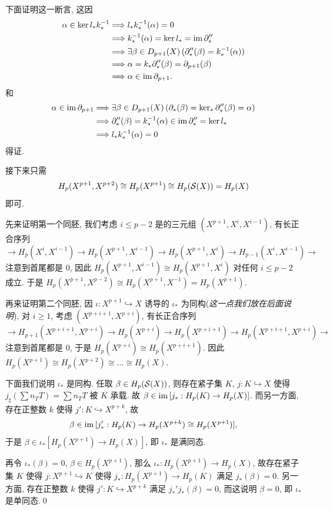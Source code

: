 \begin{Proof}
	下面证明这一断言, 这因
	\[
		\begin{aligned}
			\alpha\in\ker l_*k_*^{-1}&\Longrightarrow l_*k_*^{-1}(\alpha)=0\\
			&\Longrightarrow k_*^{-1}(\alpha)=\ker l_*=\mathrm{im}\,\partial_*''\\
			&\Longrightarrow\exists\beta\in D_{p+1}(X)\,(\partial_*''(\beta)=k_*^{-1}(\alpha))\\
			&\Longrightarrow\alpha=k_*\partial_*''(\beta)=\partial_{p+1}(\beta)\\
			&\Longrightarrow\alpha\in\mathrm{im}\,\partial_{p+1}.
		\end{aligned}
	\]
	和
	\[
		\begin{aligned}
			\alpha\in\mathrm{im}\,\partial_{p+1}&\Longrightarrow\exists\beta\in D_{p+1}(X)\,(\partial_*(\beta)=\ker_*\partial_*''(\beta)=\alpha)\\
			&\Longrightarrow\partial_*''(\beta)=k_*^{-1}(\alpha)\in\mathrm{im}\,\partial_*''=\ker l_*\\
			&\Longrightarrow l_*k_*^{-1}(\alpha)=0
		\end{aligned}
	\]
	得证.

	接下来只需
	\[
		H_p(X^{p+1},X^{p+2})\cong H_p(X^{p+1})\cong H_p(\mathcal{S}(X))=H_p(X)
	\]
	即可.

	先来证明第一个同胚, 我们考虑 $ i\leqslant p-2 $ 是的三元组 $ (X^{p+1},X^i,X^{i-1}) $, 有长正合序列
	\[
		\rightarrow H_p(X^i,X^{i-1})\rightarrow H_p(X^{p+1},X^{i-1})\rightarrow H_p(X^{p+1},X^i)\rightarrow H_{p-1}(X^{i},X^{i-1})\rightarrow
	\]
	注意到首尾都是 0, 因此 $ H_p(X^{p+1},X^{i-1})\cong H_p(X^{p+1},X^i) $ 对任何 $ i\leqslant p-2 $ 成立. 于是 $ H_p(X^{p+1},X^{p-2})\cong H_p(X^{p+1},X^{-1})=H_p(X^{p+1}) $.

	再来证明第二个同胚, 因 $ \iota : X^{p+1}\hookrightarrow X $ 诱导的 $ \iota_* $ 为同构(\textit{这一点我们放在后面说明}), 对 $ i\geqslant 1 $, 考虑 $ (X^{p+i+1},X^{p+i}) $, 有长正合序列
	\[
		\rightarrow H_{p+1}(X^{p+i+1},X^{p+i})\rightarrow H_p(X^{p+i})\rightarrow H_p(X^{p+i+1})\rightarrow H_{p}(X^{p+i+1},X^{p+i})\rightarrow
	\]
	注意到首尾都是 0, 于是 $ H_p(X^{p+i})\cong H_p(X^{p+i+1}) $. 因此 $ H_p(X^{p+1})\cong H_p(X^{p+2})\cong \dots\cong H_p(X) $.

	下面我们说明 $ \iota_* $ 是同构. 任取 $ \beta\in H_p(\mathcal{S}(X)) $, 则存在紧子集 $ K $, $ j : K\hookrightarrow X $ 使得 $ j_\sharp(\sum n_TT)=\sum n_TT $ 被 $ K $ 承载. 故 $ \beta\in\mathrm{im}\,[j_* : H_p(K)\to H_p(X)] $. 而另一方面, 存在正整数 $ k $ 使得 $ j' : K\hookrightarrow X^{p+k} $, 故
	\[
		\beta\in\mathrm{im}\,[j_*' : H_p(K)\to H_p(X^{p+k})\cong H_p(X^{p+1})],
	\]
	于是 $ \beta\in\iota_*[H_p(X^{p+1})\to H_p(X)] $, 即 $ \iota_* $ 是满同态.

	再令 $ \iota_*(\beta)=0 $, $ \beta\in H_p(X^{p+1}) $, 那么 $ \iota_* : H_p(X^{p+1})\to H_p(X) $, 故存在紧子集 $ K $ 使得 $ j : X^{p+1}\hookrightarrow K $ 使得 $ j_* : H_p(X^{p+1})\to H_p(K) $ 满足 $ j_*(\beta)=0 $. 另一方面, 存在正整数 $ k $ 使得 $ j' : K\hookrightarrow X^{p+k} $ 满足 $ j_*'j_*(\beta)=0 $, 而这说明 $ \beta=0 $, 即 $ \iota_* $ 是单同态.\qed
\end{Proof}



